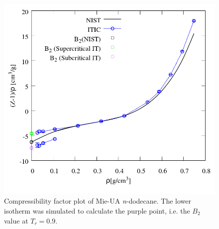 \documentclass[5p,times]{elsarticle}
\begin{document}

\begin{figure}
\includegraphics[scale=0.30]{Figures/EXAMPLE-SIM_Mie-C12_zrho.png}
\caption{Compressibility factor plot of Mie-UA \textit{n}-dodecane. The lower isotherm was simulated to calculate the purple point, i.e. the $B_2$ value at $T_r=0.9$.}
\label{fig:EXAMPLE-SIM/Mie-C12/Z_rho}
\end{figure} 


\end{document}
